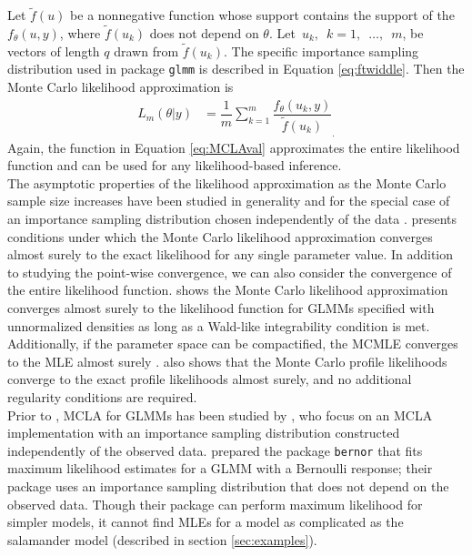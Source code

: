 \documentclass[article]{jss}
\begin{document}
Let $\tilde{f}(u)$ be a nonnegative function whose support contains the support of the $f_\theta(u,y)$, where $\tilde{f}(u_k)$ does not depend on $\theta$. Let\hbox{ $u_k,$ $k=1,$ $\ldots,$ $m$}, be vectors of length $q$ drawn from  $\tilde{f}(u_k)$.   The specific importance sampling distribution used in  package \texttt{glmm} is described in Equation \ref{eq:ftwiddle}. 
Then the Monte Carlo  likelihood approximation is
\begin{align}
L_{m}(\theta|y) &=   \dfrac{1}{m} \sum_{k=1}^m  \dfrac{ f_\theta(u_k,y)   }{\tilde{f}(u_k)}_. \label{eq:MCLAval}
\end{align}
Again, the function in Equation \ref{eq:MCLAval} approximates the entire likelihood function and can be used for any likelihood-based inference.\\





The asymptotic properties of the likelihood approximation as the Monte Carlo sample size increases have been studied in generality  \citep{geyer:1994, geyer:thom:1992} and   for the special case of an importance sampling distribution chosen independently of the data \citep{sung:geyer:2007}.  \citet{geyer:1994} presents conditions under which  the Monte Carlo likelihood approximation converges almost surely to the exact likelihood for any single parameter value.  In addition to studying the point-wise convergence,  we can also consider  the convergence of the entire likelihood function.
\citet{geyer:1994} shows the Monte Carlo likelihood approximation converges almost surely to the likelihood function for GLMMs specified with  unnormalized densities as long as a Wald-like integrability condition is met.
 Additionally, if the parameter space can be compactified, the MCMLE converges to the MLE almost surely \citep{geyer:1994}. \citet{geyer:1994} also shows that the Monte Carlo profile likelihoods converge to the exact profile likelihoods almost surely, and no additional regularity conditions are required.\\



Prior to , MCLA for GLMMs has  been studied by \citet{sung:geyer:2007}, who  focus on an MCLA implementation with an importance sampling distribution constructed independently of the observed data. \citet{sung:geyer:2007} prepared the  package \texttt{bernor} that  fits maximum likelihood estimates for a GLMM with a Bernoulli response; their package uses an importance sampling distribution that does not depend on the observed data. Though their package can perform maximum likelihood for simpler models,  it cannot find MLEs for a model as complicated as the salamander model (described in section \ref{sec:examples}).  \\
\end{document}
